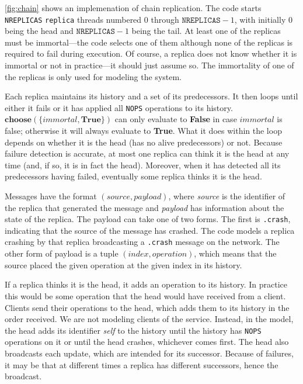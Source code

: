 \documentclass{report}
\begin{document}
\autoref{fig:chain} shows an implemenation of chain replication.
The code starts \texttt{NREPLICAS} \texttt{replica} threads numbered
0 through $\mathtt{NREPLICAS} - 1$, with initially 0 being the head
and $\mathtt{NREPLICAS} - 1$ being the tail.  At least one of the replicas 
must be immortal---the code selects one of them although none of the
replicas is required to fail during execution.
Of course, a replica does not know whether it is immortal
or not in practice---it should just assume so.
The immortality of one of the replicas is only used for modeling the system.

Each replica maintains its history and a set of its predecessors.
It then loops until either it fails or it has applied all
\texttt{NOPS} operations to its history.
$\mathbf{choose}(\{ \mathit{immortal}, \textbf{True} \})$ can only
evaluate to \textbf{False} in case $\textit{immortal}$ is false; otherwise
it will always evaluate to \textbf{True}.
What it does within the loop depends on whether it is the head
(has no alive predecessors) or not.
Because failure detection is accurate, at most one replica can think
it is the head at any time (and, if so, it is in fact the head).
Moreover, when it has
detected all its predecessors having failed, eventually some replica
thinks it is the head.

Messages have the format $(\mathit{source}, \mathit{payload})$,
where \textit{source} is the identifier of the replica that generated
the message and \textit{payload} has information about the state of
the replica.  The payload can take one of two forms.  The first is
\texttt{.crash}, indicating that the source of the message has
crashed.  The code models a replica crashing by that replica broadcasting
a \texttt{.crash} message on the network.
The other form of payload is a tuple
$(\mathit{index}, \mathit{operation})$, which means that the source
placed the given operation at the given index in its history.

If a replica thinks it is the head, it adds an operation to its
history.
In practice this would be some operation that the head would have received
from a client.  Clients send their operations to the head, which adds them
to its history in the order received.
We are not modeling clients of the service.
Instead, in the model, the head adds its identifier \textit{self} to the
history until the
history has \texttt{NOPS} operations on it or until the head crashes,
whichever comes first.  The head also broadcasts each update, which
are intended for its successor.  Because of failures, it may be that
at different times a replica has different successors, hence the
broadcast.
\end{document}
